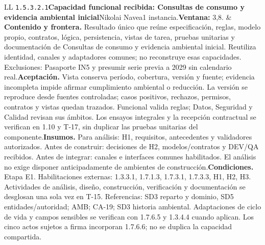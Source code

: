 \begin{longtable}{L{\tabcolsep\relax}L{\tabcolsep\relax}}
\texttt{1.\allowbreak{}5.\allowbreak{}3.\allowbreak{}2.\allowbreak{}1}\newline{}\textbf{Capacidad funcional recibida: Consultas de consumo y evidencia ambiental inicial}\newline{}Nikolai Navea\newline{}1 instancia.\newline{}\textbf{Ventana:} 3,8. & \textbf{Contenido y frontera.} Resultado único que reúne especificación, reglas, modelo propio, contratos, lógica, persistencia, vistas de tarea, pruebas unitarias y documentación de Consultas de consumo y evidencia ambiental inicial. Reutiliza identidad, canales y adaptadores comunes; no reconstruye esas capacidades. Exclusiones: Pasaporte IN5 y presumir serie previa a 2029 sin calendario real.\newline{}\textbf{Aceptación.} Vista conserva período, cobertura, versión y fuente; evidencia incompleta impide afirmar cumplimiento ambiental o reducción. La versión se reproduce desde fuentes controladas; casos positivos, rechazos, permisos, contratos y vistas quedan trazados. Funcional valida reglas; Datos, Seguridad y Calidad revisan sus ámbitos. Los ensayos integrales y la recepción contractual se verifican en 1.10 y T-17, sin duplicar las pruebas unitarias del componente.\newline{}\textbf{Insumos.} Para análisis: H1, requisitos, antecedentes y validadores autorizados. Antes de construir: decisiones de H2, modelos/contratos y DEV/QA recibidos. Antes de integrar: canales e interfaces comunes habilitados. El análisis no exige disponer anticipadamente de ambientes de construcción.\newline{}\textbf{Condiciones.} Etapa E1. Habilitaciones externas: 1.3.3.1, 1.7.1.3, 1.7.3.1, 1.7.3.3, H1, H2, H3. Actividades de análisis, diseño, construcción, verificación y documentación se desglosan una sola vez en T-15. Referencias: SD3 reparto y dominio, SD5 entidades/autoridad; AMB; CA-19; SD3 historia ambiental. Adaptaciones de ciclo de vida y campos sensibles se verifican con 1.7.6.5 y 1.3.4.4 cuando aplican. Los cinco actos sujetos a firma incorporan 1.7.6.6; no se duplica la capacidad compartida.\\\hline

\end{longtable}
